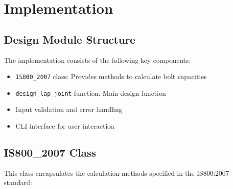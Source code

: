 \documentclass[12pt,a4paper]{article}
\begin{document}
\section{Implementation}
\subsection{Design Module Structure}
The implementation consists of the following key components:
\begin{itemize}
    \item \texttt{IS800\_2007} class: Provides methods to calculate bolt capacities
    \item \texttt{design\_lap\_joint} function: Main design function
    \item Input validation and error handling
    \item CLI interface for user interaction
\end{itemize}

\subsection{IS800\_2007 Class}
This class encapsulates the calculation methods specified in the IS800:2007 standard:
\end{document}
